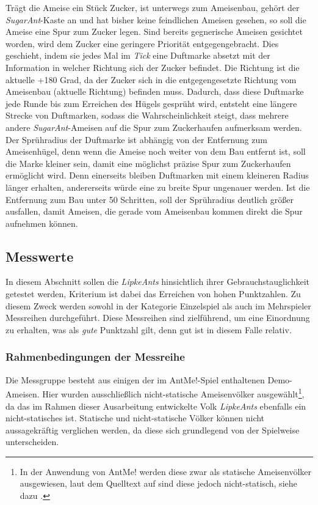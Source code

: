 Trägt die Ameise ein Stück Zucker, ist unterwegs zum Ameisenbau, gehört der \textit{SugarAnt}-Kaste an und hat bisher keine feindlichen Ameisen gesehen, so soll die Ameise eine Spur zum Zucker legen. Sind bereits gegnerische Ameisen gesichtet worden, wird dem Zucker eine geringere Priorität entgegengebracht. Dies geschieht, indem sie jedes Mal im \textit{Tick} eine Duftmarke absetzt mit der Information in welcher Richtung sich der Zucker befindet. Die Richtung ist die aktuelle +180 Grad, da der Zucker sich in die entgegengesetzte Richtung vom Ameisenbau (aktuelle Richtung) befinden muss. Dadurch, dass diese Duftmarke jede Runde bis zum Erreichen des Hügels gesprüht wird, entsteht eine längere Strecke von Duftmarken, sodass die Wahrscheinlichkeit steigt, dass mehrere andere \textit{SugarAnt}-Ameisen auf die Spur zum Zuckerhaufen aufmerksam werden. Der Sprühradius der Duftmarke ist abhängig von der Entfernung zum Ameisenhügel, denn wenn die Ameise noch weiter von dem Bau entfernt ist, soll die Marke kleiner sein, damit eine möglichst präzise Spur zum Zuckerhaufen ermöglicht wird. Denn einerseits bleiben Duftmarken mit einem kleineren Radius länger erhalten, andererseits würde eine zu breite Spur ungenauer werden. Ist die Entfernung zum Bau unter 50 Schritten, soll der Sprühradius deutlich größer ausfallen, damit Ameisen, die gerade vom Ameisenbau kommen direkt die Spur aufnehmen können.

\subsection{Messwerte}
In diesem Abschnitt sollen die \textit{LipkeAnts} hinsichtlich ihrer Gebrauchstauglichkeit getestet werden, Kriterium ist dabei das Erreichen von hohen Punktzahlen. Zu diesem Zweck werden sowohl in der Kategorie Einzelspiel als auch im Mehrspieler Messreihen durchgeführt. Diese Messreihen sind zielführend, um eine Einordnung zu erhalten, was als \textit{gute} Punktzahl gilt, denn gut ist in diesem Falle relativ.

\subsubsection{Rahmenbedingungen der Messreihe}
Die Messgruppe besteht aus einigen der im AntMe!-Spiel enthaltenen Demo-Ameisen. Hier wurden ausschließlich nicht-statische Ameisenvölker ausgewählt\footnote{In der Anwendung von AntMe! werden diese zwar als statische Ameisenvölker ausgewiesen, laut dem Quelltext auf sind diese jedoch nicht-statisch, siehe dazu \citet{GitHub2016}.}, da das im Rahmen dieser Ausarbeitung entwickelte Volk \textit{LipkeAnts} ebenfalls ein nicht-statisches ist. Statische und nicht-statische Völker können nicht aussagekräftig verglichen werden, da diese sich grundlegend von der Spielweise unterscheiden.

